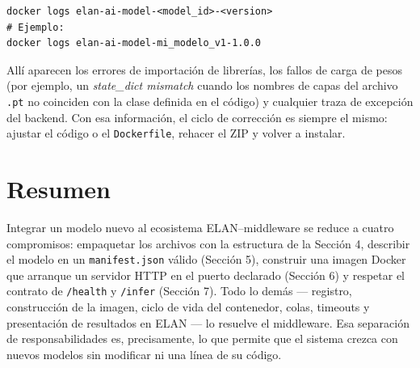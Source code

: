\documentclass[12pt,a4paper]{article}
\begin{document}
\begin{center}
\begin{minipage}{0.9\textwidth}
\small
\begin{Verbatim}[baselinestretch=0.9]
docker logs elan-ai-model-<model_id>-<version>
# Ejemplo:
docker logs elan-ai-model-mi_modelo_v1-1.0.0
\end{Verbatim}
\end{minipage}
\end{center}

Allí aparecen los errores de importación de librerías, los fallos de carga de pesos (por ejemplo, un \textit{state\_dict mismatch} cuando los nombres de capas del archivo \texttt{.pt} no coinciden con la clase definida en el código) y cualquier traza de excepción del backend. Con esa información, el ciclo de corrección es siempre el mismo: ajustar el código o el \texttt{Dockerfile}, rehacer el ZIP y volver a instalar.

\section{Resumen}

Integrar un modelo nuevo al ecosistema ELAN--middleware se reduce a cuatro compromisos: empaquetar los archivos con la estructura de la Sección 4, describir el modelo en un \texttt{manifest.json} válido (Sección 5), construir una imagen Docker que arranque un servidor HTTP en el puerto declarado (Sección 6) y respetar el contrato de \texttt{/health} y \texttt{/infer} (Sección 7). Todo lo demás --- registro, construcción de la imagen, ciclo de vida del contenedor, colas, timeouts y presentación de resultados en ELAN --- lo resuelve el middleware. Esa separación de responsabilidades es, precisamente, lo que permite que el sistema crezca con nuevos modelos sin modificar ni una línea de su código.
\end{document}

